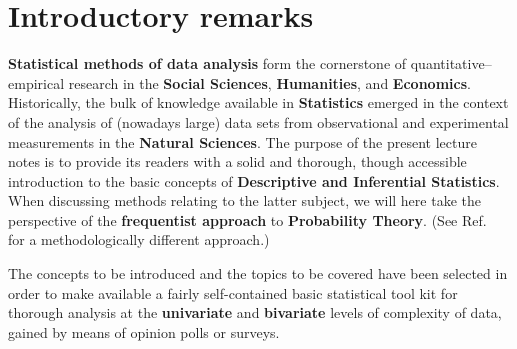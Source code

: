 \chapter*{Introductory remarks}
\textbf{Statistical methods of data analysis} form the cornerstone
of quantitative--empirical research in the \textbf{Social
Sciences}, \textbf{Humanities}, and \textbf{Economics}.
Historically, the bulk of knowledge available in
\textbf{Statistics} emerged in the context of the analysis of
(nowadays large) data sets from observational and experimental
measurements in the \textbf{ Natural Sciences}. The purpose of the
present lecture notes is to provide its readers with a solid and
thorough, though accessible introduction to the basic concepts of
\textbf{Descriptive and Inferential Statistics}. When discussing
methods relating to the latter subject, we will here take the
perspective of the \textbf{frequentist approach} to
\textbf{Probability Theory}. (See Ref.~ for a
methodologically different approach.)

\medskip
\noindent
The concepts to be introduced and the topics to be covered 
have been selected in order to make available a fairly 
self-contained basic statistical tool kit for thorough analysis 
at the \textbf{univariate} and \textbf{bivariate} levels of
complexity of data, gained by means of opinion polls or surveys.
%

